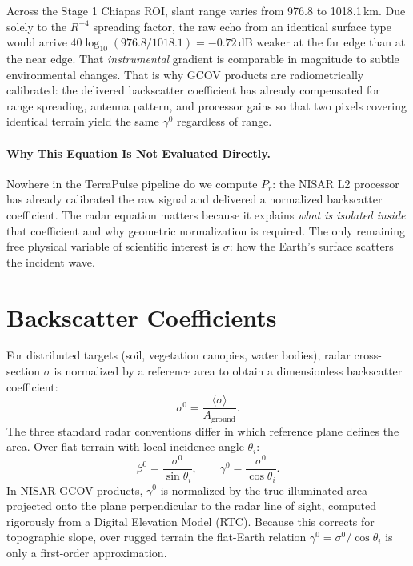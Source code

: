 \documentclass[11pt,a4paper]{article}
\begin{document}
\begin{ejemplo}
Across the Stage 1 Chiapas ROI, slant range varies from 976.8 to 1018.1\,km. Due solely to the $R^{-4}$ spreading factor, the raw echo from an identical surface type would arrive $40\log_{10}(976.8/1018.1)=-0.72$\,dB weaker at the far edge than at the near edge. That \emph{instrumental} gradient is comparable in magnitude to subtle environmental changes. That is why GCOV products are radiometrically calibrated: the delivered backscatter coefficient has already compensated for range spreading, antenna pattern, and processor gains so that two pixels covering identical terrain yield the same $\gamma^0$ regardless of range.
\end{ejemplo}

\paragraph{Why This Equation Is Not Evaluated Directly.} Nowhere in the TerraPulse pipeline do we compute $P_r$: the NISAR L2 processor has already calibrated the raw signal and delivered a normalized backscatter coefficient. The radar equation matters because it explains \emph{what is isolated inside} that coefficient and why geometric normalization is required. The only remaining free physical variable of scientific interest is $\sigma$: how the Earth's surface scatters the incident wave.

\section{Backscatter Coefficients}
\label{sec:retro}

For distributed targets (soil, vegetation canopies, water bodies), radar cross-section $\sigma$ is normalized by a reference area to obtain a dimensionless backscatter coefficient:
\begin{equation}
  \sigma^0 = \frac{\langle \sigma \rangle}{A_{\text{ground}}} .
\end{equation}
The three standard radar conventions differ in which reference plane defines the area. Over flat terrain with local incidence angle $\theta_i$:
\begin{equation}
  \beta^0 = \frac{\sigma^0}{\sin\theta_i},
  \qquad
  \gamma^0 = \frac{\sigma^0}{\cos\theta_i}.
\end{equation}
In NISAR GCOV products, $\gamma^0$ is normalized by the true illuminated area projected onto the plane perpendicular to the radar line of sight, computed rigorously from a Digital Elevation Model (RTC). Because this corrects for topographic slope, over rugged terrain the flat-Earth relation $\gamma^0 = \sigma^0/\cos\theta_i$ is only a first-order approximation.
\end{document}
